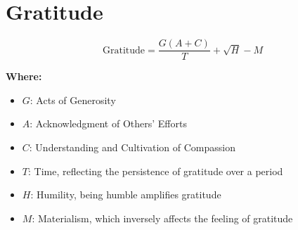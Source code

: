 \chapter{Gratitude}

\begin{equation}
\text{Gratitude} = \frac{G(A + C)}{T} + \sqrt{H} - M
\end{equation}

\textbf{Where:}

\begin{itemize}
    \item $G$: Acts of Generosity
    \item $A$: Acknowledgment of Others' Efforts
    \item $C$: Understanding and Cultivation of Compassion
    \item $T$: Time, reflecting the persistence of gratitude over a period
    \item $H$: Humility, being humble amplifies gratitude
    \item $M$: Materialism, which inversely affects the feeling of gratitude
\end{itemize}